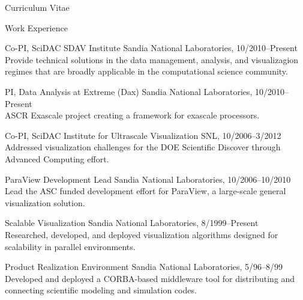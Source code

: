 \documentclass{article}
\begin{document}
\begin{cv}{Curriculum Vitae}
    \begin{cvlist}{Work Experience}
    \item[Co-PI, SciDAC SDAV Institute]\hfill Sandia National Laboratories, 10/2010--Present\\
      Provide technical solutions in the data management, analysis, and
      visualizagion regimes that are broadly applicable in the
      computational science community.
    \item[PI, Data Analysis at Extreme (Dax)]\hfill Sandia National Laboratories, 10/2010--Present\\
      ASCR Exascale project creating a framework for exascale processors.
    \item[Co-PI, SciDAC Institute for Ultrascale Visualization]\hfill SNL, 10/2006--3/2012\\
      Addressed visualization challenges for the DOE Scientific Discover
      through Advanced Computing effort.
    \item[ParaView Development Lead]\hfill Sandia National Laboratories, 10/2006--10/2010\\
      Lead the ASC funded development effort for ParaView, a large-scale
      general visualization solution.
    \item[Scalable Visualization]\hfill Sandia National Laboratories, 8/1999--Present \\
      Researched, developed, and deployed visualization algorithms designed
      for scalability in parallel environments.
    \item[Product Realization Environment]\hfill Sandia National Laboratories,
      5/96--8/99 \\
      Developed and deployed a CORBA-based middleware tool for distributing
      and connecting scientific modeling and simulation codes.
    \end{cvlist}


\end{cv}
\end{document}
